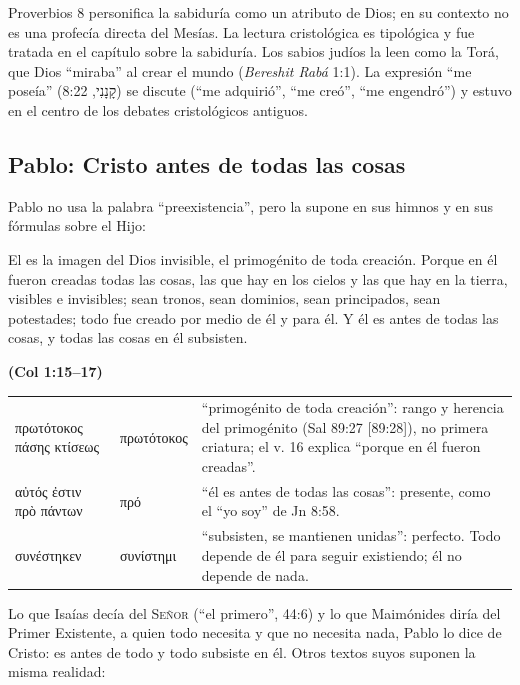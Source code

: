 \documentclass[11pt,letterpaper]{article}
\newcommand{\heb}[1]{\mbox{\foreignlanguage{hebrew}{#1}}}
\newcommand{\grc}[1]{\foreignlanguage{ancientgreek}{#1}}
\newcommand{\SENOR}{\textsc{Señor}}
\newcommand{\fuente}[1]{\par\hfill{\upshape\bfseries\small\textcolor{azul}{#1}}}
\begin{document}
\begin{nota}[Precisión]
Proverbios 8 personifica la sabiduría como un atributo de Dios; en su contexto no es una profecía directa del Mesías. La lectura cristológica es tipológica y fue tratada en el capítulo sobre la sabiduría. Los sabios judíos la leen como la Torá, que Dios ``miraba'' al crear el mundo (\emph{Bereshit Rabá} 1:1). La expresión ``me poseía'' (\heb{קָנָנִי}, 8:22) se discute (``me adquirió'', ``me creó'', ``me engendró'') y estuvo en el centro de los debates cristológicos antiguos.
\end{nota}

\subsection{Pablo: Cristo antes de todas las cosas}\label{sec:pablo}
Pablo no usa la palabra ``preexistencia'', pero la supone en sus himnos y en sus fórmulas sobre el Hijo:

\begin{cita}El es la imagen del Dios invisible, el primogénito de toda creación. Porque en él fueron creadas todas las cosas, las que hay en los cielos y las que hay en la tierra, visibles e invisibles; sean tronos, sean dominios, sean principados, sean potestades; todo fue creado por medio de él y para él. Y él es antes de todas las cosas, y todas las cosas en él subsisten.\fuente{(Col 1:15--17)}\end{cita}

\begin{filologia}[Col 1:15--17]
\begin{tabular}{@{}L{3.2cm}L{1.6cm}L{10cm}@{}}
\grc{πρωτότοκος πάσης κτίσεως} & \grc{πρωτότοκος} & ``primogénito de toda creación'': rango y herencia del primogénito (Sal 89:27 [89:28]), no primera criatura; el v. 16 explica ``porque en él fueron creadas''. \\[2pt]
\grc{αὐτός ἐστιν πρὸ πάντων} & \grc{πρό} & ``él es antes de todas las cosas'': presente, como el ``yo soy'' de Jn 8:58. \\[2pt]
\grc{συνέστηκεν} & \grc{συνίστημι} & ``subsisten, se mantienen unidas'': perfecto. Todo depende de él para seguir existiendo; él no depende de nada. \\
\end{tabular}
\end{filologia}

Lo que Isaías decía del \SENOR{} (``el primero'', 44:6) y lo que Maimónides diría del Primer Existente, a quien todo necesita y que no necesita nada, Pablo lo dice de Cristo: es antes de todo y todo subsiste en él. Otros textos suyos suponen la misma realidad:
\end{document}
